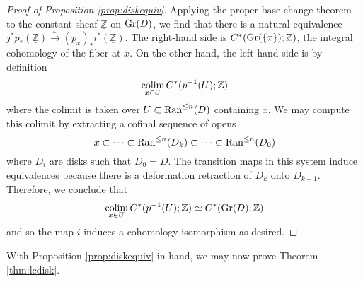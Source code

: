 \begin{proof}[Proof of Proposition \ref{prop:diskequiv}]
Applying the proper base change theorem to the constant sheaf $\underline{\mathbb{Z}}$ on $\operatorname{\mathrm{Gr}}(D)$, we find that there is a natural equivalence $j^*p_*(\underline{\mathbb{Z}}) \xrightarrow{\sim} (p_x)_{*}i^*(\underline{\mathbb{Z}}).$  The right-hand side is $C^*(\operatorname{\mathrm{Gr}}(\{x\}) ;\mathbb{Z})$, the integral cohomology of the fiber at $x$.  On the other hand, the left-hand side is by definition $$\operatorname*{\mathrm{colim}}_{x\in U} C^*(p^{-1}(U);\mathbb{Z})$$ where the colimit is taken over $U\subset \operatorname{\mathrm{Ran}}^{\leq n}(D)$ containing $x$.  We may compute this colimit by extracting a cofinal sequence of opens $$x \subset \cdots \subset \operatorname{\mathrm{Ran}}^{\leq n}(D_k) \subset \cdots \subset \operatorname{\mathrm{Ran}}^{\leq n}(D_0)$$ where $D_i$ are disks such that $D_0=D$.  The transition maps in this system induce equivalences because there is a deformation retraction of $D_k$ onto $D_{k+1}$.  Therefore, we conclude that $$\operatorname*{\mathrm{colim}}_{x\in U} C^*(p^{-1}(U);\mathbb{Z}) \simeq C^*(\operatorname{\mathrm{Gr}}(D); \mathbb{Z})$$ and so the map $i$ induces a cohomology isomorphism as desired.  
\end{proof} 

With Proposition \ref{prop:diskequiv} in hand, we may now prove Theorem \ref{thm:lcdisk}.

